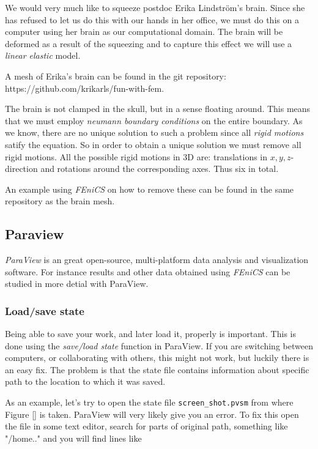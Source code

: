 \documentclass[epsfig,11pt]{article}
\begin{document}
We would very much like to squeeze postdoc Erika Lindström's brain. Since she has refused to let us do this with our hands in her office, we must do this on a computer using her brain as our computational domain. The brain will be deformed as a result of the squeezing and to capture this effect we will use a \emph{linear elastic} model. 

A mesh of Erika's brain can be found in the git repository:
 https://github.com/krikarls/fun-with-fem. 
 

The brain is not clamped in the skull, but in a sense floating around. This means that we must employ \emph{neumann boundary conditions} on the entire boundary. As we know, there are no unique solution to such a problem since all \emph{rigid motions} satify the equation. So in order to obtain a unique solution we must remove all rigid motions. All the possible rigid motions in 3D are: translations in $x,y,z$-direction and rotations around the corresponding axes. Thus six in total.

An example using \emph{FEniCS} on how to remove these can be found in the same repository as the brain mesh. 

\subsection{Paraview}
\emph{ParaView} is an great open-source, multi-platform data analysis and visualization software. For instance results and other data obtained using \emph{FEniCS} can be studied in more detial with ParaView.  

\subsubsection{Load/save state}

Being able to save your work, and later load it, properly is important. This is done using the \emph{save/load state} function in ParaView. If you are switching between computers, or collaborating with others, this might not work, but luckily there is an easy fix. The problem is that the state file contains information about specific path to the location to which it was saved. 

As an example, let's try to open the state file  \texttt{screen\_shot.pvsm} from where Figure [] is taken. ParaView will very likely give you an error. To fix this open the file in some text editor, search for parts of original path, something like "/home.." and you will find lines like 
\end{document}
